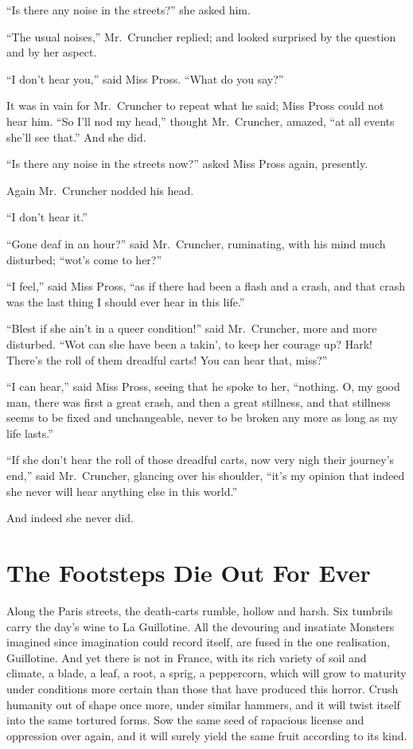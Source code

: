 ``Is there any noise in the streets?'' she asked him.

``The usual noises,'' Mr.\ Cruncher replied; and looked surprised by the
question and by her aspect.

``I don't hear you,'' said Miss Pross.  ``What do you say?''

It was in vain for Mr.\ Cruncher to repeat what he said; Miss Pross
could not hear him.  ``So I'll nod my head,'' thought Mr.\ Cruncher,
amazed, ``at all events she'll see that.''  And she did.

``Is there any noise in the streets now?'' asked Miss Pross again,
presently.

Again Mr.\ Cruncher nodded his head.

``I don't hear it.''

``Gone deaf in an hour?'' said Mr.\ Cruncher, ruminating, with his mind
much disturbed; ``wot's come to her?''

``I feel,'' said Miss Pross, ``as if there had been a flash and a crash,
and that crash was the last thing I should ever hear in this life.''

``Blest if she ain't in a queer condition!'' said Mr.\ Cruncher, more
and more disturbed.  ``Wot can she have been a takin', to keep her
courage up?  Hark!  There's the roll of them dreadful carts!  You can
hear that, miss?''

``I can hear,'' said Miss Pross, seeing that he spoke to her,
``nothing. O, my good man, there was first a great crash, and then a
great stillness, and that stillness seems to be fixed and
unchangeable, never to be broken any more as long as my life lasts.''

``If she don't hear the roll of those dreadful carts, now very nigh
their journey's end,'' said Mr.\ Cruncher, glancing over his shoulder,
``it's my opinion that indeed she never will hear anything else in
this world.''

And indeed she never did.



\chapter{The Footsteps Die Out For Ever}


Along the Paris streets, the death-carts rumble, hollow and harsh.
Six tumbrils carry the day's wine to La Guillotine.  All the
devouring and insatiate Monsters imagined since imagination could
record itself, are fused in the one realisation, Guillotine.  And yet
there is not in France, with its rich variety of soil and climate,
a blade, a leaf, a root, a sprig, a peppercorn, which will grow to
maturity under conditions more certain than those that have produced
this horror.  Crush humanity out of shape once more, under similar
hammers, and it will twist itself into the same tortured forms.
Sow the same seed of rapacious license and oppression over again,
and it will surely yield the same fruit according to its kind.

